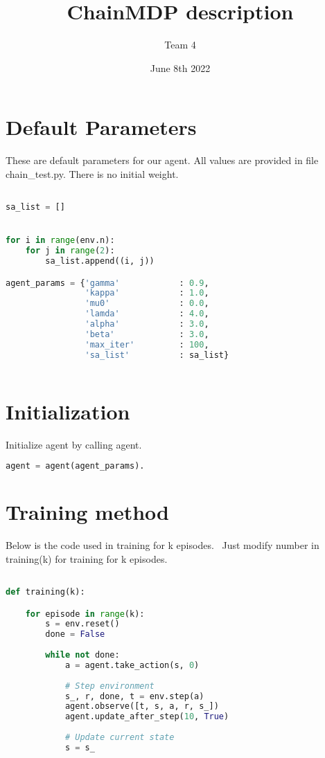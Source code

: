 \documentclass{article}
\title{ChainMDP description}
\author{Team 4}
\date{June 8th 2022}
\begin{document}
\maketitle

\section{Default Parameters}
\begin{flushleft}
These are default parameters for our agent. All values are provided in file chain\_test.py. There is no initial weight. 
\end{flushleft}
\begin{lstlisting}[language=Python]

sa_list = []


for i in range(env.n):
    for j in range(2):
        sa_list.append((i, j))

agent_params = {'gamma'            : 0.9,
                'kappa'            : 1.0,
                'mu0'              : 0.0,
                'lamda'            : 4.0,
                'alpha'            : 3.0,
                'beta'             : 3.0,
                'max_iter'         : 100,
                'sa_list'          : sa_list}
                
\end{lstlisting}

\section{Initialization}

Initialize agent by calling agent.
\begin{lstlisting}[language=Python]
agent = agent(agent_params).
\end{lstlisting}
\section{Training method}
\begin{flushleft}
Below is the code used in training for k episodes. \ Just modify number in training(k) for training for k episodes. 
\end{flushleft}
\begin{lstlisting}[language=Python]

def training(k):

    for episode in range(k): 
        s = env.reset()
        done = False
      
        while not done:
            a = agent.take_action(s, 0)
          
            # Step environment
            s_, r, done, t = env.step(a)
            agent.observe([t, s, a, r, s_])
            agent.update_after_step(10, True)
          
            # Update current state
            s = s_
            
\end{lstlisting}
\end{document}
